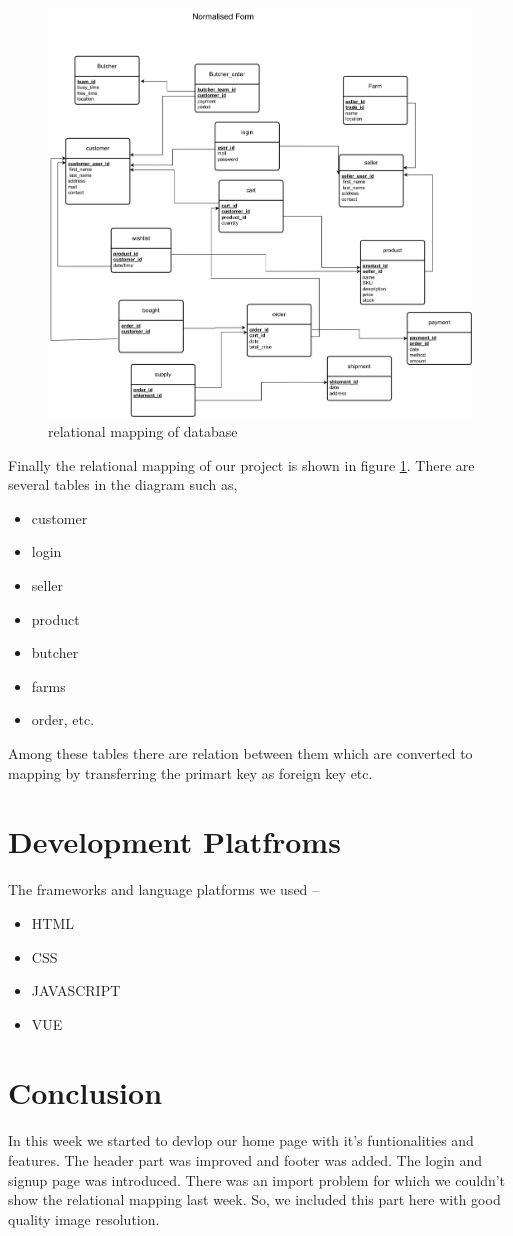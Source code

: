 \documentclass[a4paper,12pt]{report}
\begin{document}
\begin{figure}
	\includegraphics[keepaspectratio, width=\linewidth]{smartHattdbmapping.png}
	\caption{relational mapping of database}
	\label{mapping}
\end{figure}
Finally the relational mapping of our project is shown in figure \ref{mapping}. There are several tables in the diagram such as, 
\begin{itemize}
	\item customer
	\item login
	\item seller
	\item product
	\item butcher
	\item farms
	\item order, etc.
\end{itemize}
 Among these tables there are relation between them which are converted to mapping by transferring the primart key as foreign key etc.

\section*{Development Platfroms}
The frameworks and language platforms we used --
\begin{itemize}
	\item HTML
	\item CSS
	\item JAVASCRIPT
	\item VUE
\end{itemize}

\section*{Conclusion}
In this week we started to devlop our home page with it's funtionalities and features. The header part was improved and footer was added. The login and signup page was introduced. There was an import problem for which we couldn't show the relational mapping last week. So, we included this part here with good quality image resolution.
\end{document}

